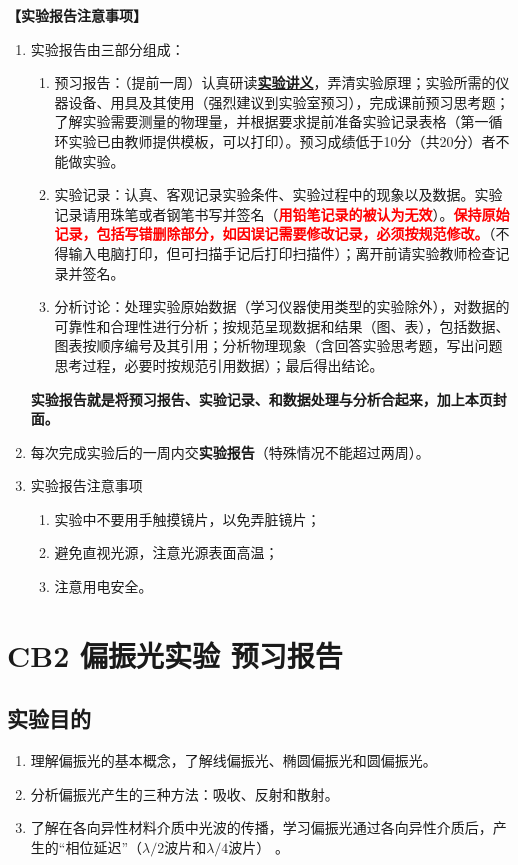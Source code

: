 \documentclass[dvipsnames, svgnames,a4paper,11pt]{article}
\begin{document}
\textbf{【实验报告注意事项】}
\begin{enumerate}
	\item 实验报告由三部分组成：
	\begin{enumerate}
		\item 预习报告：（提前一周）认真研读\underline{\textbf{实验讲义}}，弄清实验原理；实验所需的仪器设备、用具及其使用（强烈建议到实验室预习），完成课前预习思考题；了解实验需要测量的物理量，并根据要求提前准备实验记录表格（第一循环实验已由教师提供模板，可以打印）。预习成绩低于10分（共20分）者不能做实验。
	    \item 实验记录：认真、客观记录实验条件、实验过程中的现象以及数据。实验记录请用珠笔或者钢笔书写并签名（\textcolor{red}{\textbf{用铅笔记录的被认为无效}}）。\textcolor{red}{\textbf{保持原始记录，包括写错删除部分，如因误记需要修改记录，必须按规范修改。}}（不得输入电脑打印，但可扫描手记后打印扫描件）；离开前请实验教师检查记录并签名。
	    \item 分析讨论：处理实验原始数据（学习仪器使用类型的实验除外），对数据的可靠性和合理性进行分析；按规范呈现数据和结果（图、表），包括数据、图表按顺序编号及其引用；分析物理现象（含回答实验思考题，写出问题思考过程，必要时按规范引用数据）；最后得出结论。
	\end{enumerate}
	\textbf{实验报告就是将预习报告、实验记录、和数据处理与分析合起来，加上本页封面。}
	\item 每次完成实验后的一周内交\textbf{实验报告}（特殊情况不能超过两周）。
	\item 实验报告注意事项
		\begin{enumerate}[label=\roman*.]
			\item 实验中不要用手触摸镜片，以免弄脏镜片；
			\item 避免直视光源，注意光源表面高温；
			\item 注意用电安全。
			
		\end{enumerate}
\end{enumerate}


\clearpage
\tableofcontents
\clearpage

\setcounter{section}{0}
\section{CB2 \quad 偏振光实验 \quad\heiti 预习报告}
	
\subsection{实验目的}
\begin{enumerate}
	\item 理解偏振光的基本概念，了解线偏振光、椭圆偏振光和圆偏振光。
	\item 分析偏振光产生的三种方法：吸收、反射和散射。
	\item 了解在各向异性材料介质中光波的传播，学习偏振光通过各向异性介质后，产生的“相位延迟”（$\lambda/ 2$波片和$\lambda/ 4$波片） 。
	
\end{enumerate}
\end{document}
